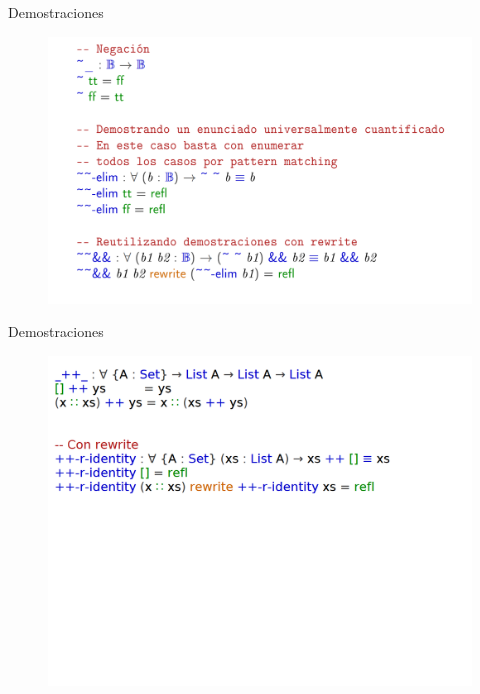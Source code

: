 \documentclass[11pt]{beamer}
\begin{document}
\begin{frame}{Demostraciones}
\begin{figure}
\includegraphics[scale=0.7]{img/dems}
\end{figure}
\end{frame}



\begin{frame}{Demostraciones}
\begin{figure}
\includegraphics[scale=0.7]{img/reasoning01}
\end{figure}
\end{frame}
\end{document}

